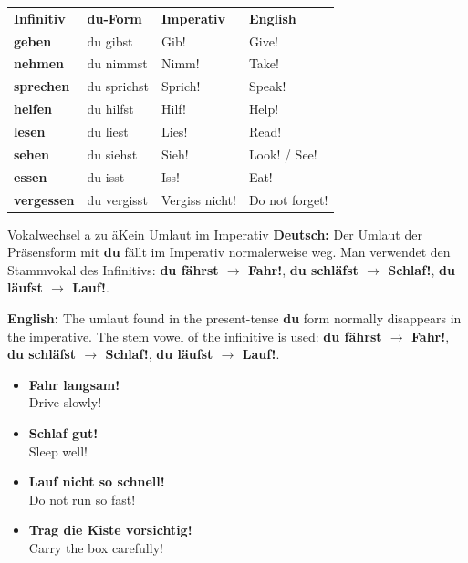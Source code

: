 \documentclass[a4paper,11pt]{article}
\newcommand{\GermanText}[1]{\textbf{Deutsch: }#1\par}
\newcommand{\EnglishText}[1]{{\small\color{SoftGray}\textbf{English: }#1\par}}
\newcommand{\ExampleItem}[2]{\item \textbf{#1}\\{\small\color{SoftGray}#2}}
\begin{document}
        \begin{longtable}{>{\bfseries}p{3.1cm}|p{3.4cm}|p{3.4cm}|p{4.7cm}}
            \rowcolor{HeaderBlueDark}
            \color{white}\textbf{Infinitiv} &
            \color{white}\textbf{du-Form} &
            \color{white}\textbf{Imperativ} &
            \color{white}\textbf{English} \\
            geben & du gibst & Gib! & Give! \\
            nehmen & du nimmst & Nimm! & Take! \\
            sprechen & du sprichst & Sprich! & Speak! \\
            helfen & du hilfst & Hilf! & Help! \\
            lesen & du liest & Lies! & Read! \\
            sehen & du siehst & Sieh! & Look! / See! \\
            essen & du isst & Iss! & Eat! \\
            vergessen & du vergisst & Vergiss nicht! & Do not forget! \\
        \end{longtable}

        \begin{grammarentry}{Vokalwechsel a zu ä}{Kein Umlaut im Imperativ}
            \GermanText{Der Umlaut der Präsensform mit \textbf{du} fällt im Imperativ normalerweise weg. Man verwendet den Stammvokal des Infinitivs: \textbf{du fährst $\rightarrow$ Fahr!}, \textbf{du schläfst $\rightarrow$ Schlaf!}, \textbf{du läufst $\rightarrow$ Lauf!}.}
            \EnglishText{The umlaut found in the present-tense \textbf{du} form normally disappears in the imperative. The stem vowel of the infinitive is used: \textbf{du fährst $\rightarrow$ Fahr!}, \textbf{du schläfst $\rightarrow$ Schlaf!}, \textbf{du läufst $\rightarrow$ Lauf!}.}
        \end{grammarentry}

        \begin{exbox}
            \begin{itemize}
                \ExampleItem{Fahr langsam!}{Drive slowly!}
                \ExampleItem{Schlaf gut!}{Sleep well!}
                \ExampleItem{Lauf nicht so schnell!}{Do not run so fast!}
                \ExampleItem{Trag die Kiste vorsichtig!}{Carry the box carefully!}
            \end{itemize}
        \end{exbox}
\end{document}
